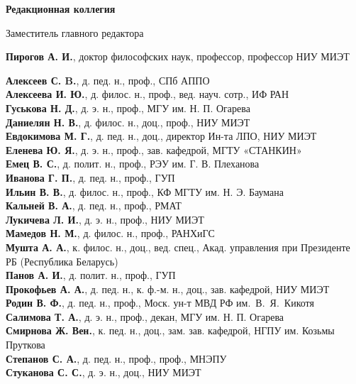 \begin{minipage}[t]{.48\textwidth}
    
    \begin{flushleft}
        \footnotesize
 \begin{center}
\textbf{Редакционная коллегия}
\end{center}

Заместитель главного редактора

\textbf{Пирогов А. И.}, доктор философских наук, профессор,
профессор НИУ МИЭТ


\vspace{1em}
\textbf{Алексеев С. B.}, д. пед. н., проф., СПб АППО\\
\textbf{Алексеева И. Ю.}, д. филос. н., проф., вед. науч. сотр.,
ИФ РАН\\
\textbf{Гуськова Н. Д.}, д. э. н., проф., МГУ им. Н. П. Огарева\\
\textbf{Даниелян Н. В.}, д. филос. н., доц., проф., НИУ МИЭТ\\
\textbf{Евдокимова М. Г.}, д. пед. н., доц.,
директор Ин-та ЛПО, НИУ МИЭТ\\
\textbf{Еленева Ю. Я.}, д. э. н., проф., зав. кафедрой,
МГТУ «СТАНКИН»\\
\textbf{Емец В. С.}, д. полит. н., проф., РЭУ им. Г. В. Плеханова\\
\textbf{Иванова Г. П.}, д. пед. н., проф., ГУП\\
\textbf{Ильин В. В.}, д. филос. н., проф.,
КФ МГТУ им. Н. Э. Баумана\\
\textbf{Кальней В. А.}, д. пед. н., проф., РМАТ\\
\textbf{Лукичева Л. И.}, д. э. н., проф., НИУ МИЭТ\\
\textbf{Мамедов Н. М.}, д. филос. н., проф., РАНХиГС\\
\textbf{Мушта А. А.}, к. филос. н., доц., вед. спец., Акад. управления при Президенте РБ (Республика Беларусь)\\
\textbf{Панов А. И.}, д. полит. н., проф., ГУП\\
\textbf{Прокофьев А. А.}, д. пед. н., к. ф.-м. н., доц.,
зав. кафедрой, НИУ МИЭТ\\
\textbf{Родин В. Ф.}, д. пед. н., проф., Моск. ун-т МВД РФ
им. В. Я. Кикотя\\
\textbf{Салимова Т. А.}, д. э. н., проф.,
декан, МГУ им. Н. П. Огарева\\
\textbf{Смирнова Ж. Вен.}, к. пед. н., доц., зам. зав. кафедрой,
НГПУ им. Козьмы Пруткова\\
\textbf{Степанов С. А.}, д. пед. н., проф., проф., МНЭПУ\\
\textbf{Стуканова С. С.}, д. э. н., доц., НИУ МИЭТ
\end{flushleft}
\end{minipage}

